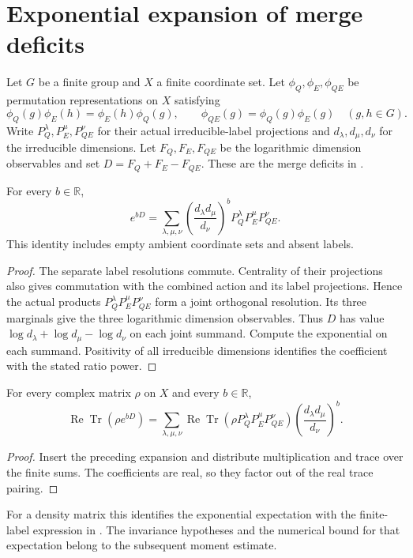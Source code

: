 \section{Exponential expansion of merge deficits}
\label{sec:merge_exponential}

Let $G$ be a finite group and $X$ a finite coordinate set. Let
$\phi_Q,\phi_E,\phi_{QE}$ be permutation representations on $X$ satisfying
\[
 \phi_Q(g)\phi_E(h)=\phi_E(h)\phi_Q(g),\qquad
 \phi_{QE}(g)=\phi_Q(g)\phi_E(g)\quad(g,h\in G).
\]
Write $P_Q^\lambda,P_E^\mu,P_{QE}^\nu$ for their actual irreducible-label
projections and $d_\lambda,d_\mu,d_\nu$ for the irreducible dimensions.
Let $F_Q,F_E,F_{QE}$ be the logarithmic dimension observables and set
$D=F_Q+F_E-F_{QE}$. These are the merge deficits in
\cite[Section~7, equations \textup{(comparator:merge-decomposition)} and
\textup{(comparator:merge-moments)}]{OpenAI2026AreaLaw}.

\begin{theorem}
\label{thm:exp_merge_deficit_eq_sum}
\leanok
For every $b\in\mathbb R$,
\[
 e^{bD}=\sum_{\lambda,\mu,\nu}
 \left(\frac{d_\lambda d_\mu}{d_\nu}\right)^b
 P_Q^\lambda P_E^\mu P_{QE}^\nu.
\]
This identity includes empty ambient coordinate sets and absent labels.
\end{theorem}
\begin{proof}
\leanok
The separate label resolutions commute. Centrality of their projections
also gives commutation with the combined action and its label projections.
Hence the actual products $P_Q^\lambda P_E^\mu P_{QE}^\nu$ form a joint
orthogonal resolution. Its three marginals give the three logarithmic
dimension observables. Thus $D$ has value
$\log d_\lambda+\log d_\mu-\log d_\nu$ on each joint summand.
Compute the exponential on each summand. Positivity of all irreducible
dimensions identifies the coefficient with the stated ratio power.
\end{proof}

\begin{theorem}
\label{thm:re_trace_exp_merge_deficit_eq_sum}
\leanok
For every complex matrix $\rho$ on $X$ and every $b\in\mathbb R$,
\[
 \operatorname{Re}\operatorname{Tr}(\rho e^{bD})
 =\sum_{\lambda,\mu,\nu}
   \operatorname{Re}\operatorname{Tr}
      (\rho P_Q^\lambda P_E^\mu P_{QE}^\nu)
   \left(\frac{d_\lambda d_\mu}{d_\nu}\right)^b.
\]
\end{theorem}
\begin{proof}
\leanok
{}
Insert the preceding expansion and distribute multiplication and trace
over the finite sums. The coefficients are real, so they factor out of
the real trace pairing.
\end{proof}

For a density matrix this identifies the exponential expectation with the
finite-label expression in
\cite[Section~5, equation \textup{(replicas:merge-moment)}]{OpenAI2026AreaLaw}.
The invariance hypotheses and the numerical bound for that expectation
belong to the subsequent moment estimate.

